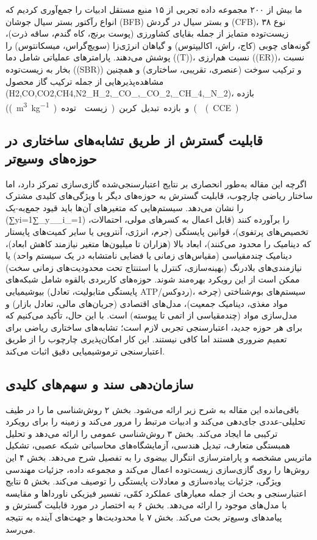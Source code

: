 \documentclass[12pt, a4paper]{article}
\begin{document}
ما بیش از ۲۰۰ مجموعه داده تجربی از ۱۵ منبع مستقل ادبیات را جمع‌آوری کردیم که انواع رآکتور بستر سیال جوشان (BFB) و بستر سیال در گردش (CFB)، ۳۸ نوع زیست‌توده متمایز از جمله بقایای کشاورزی (پوست برنج، کاه گندم، ساقه ذرت)، گونه‌های چوبی (کاج، راش، اکالیپتوس) و گیاهان انرژی‌زا (سویچ‌گراس، ميسکانتوس) را پوشش می‌دهند. پارامترهای عملیاتی شامل دما (\en(T))، نسبت هم‌ارزی (\en(ER))، نسبت بخار به زیست‌توده (\en(SBR)) و ترکیب سوخت (عنصری، تقریبی، ساختاری) و همچنین مشاهده‌پذیرهایی از جمله ترکیب گاز محصول (H2,CO,CO2,CH4,N2\_H\_2,\_CO\_,\_CO\_2,\_CH\_4,\_N\_2)، بازده (\si(\cubic\metre\per\kilogram) زیست‌توده) و بازده تبدیل کربن (\en(CCE)\\%

\subsection{قابلیت گسترش از طریق تشابه‌های ساختاری در حوزه‌های وسیع‌تر}

اگرچه این مقاله به‌طور انحصاری بر نتایج اعتبارسنجی‌شده گازی‌سازی تمرکز دارد، اما ساختار ریاضی چارچوب، قابلیت گسترش به حوزه‌های دیگر با ویژگی‌های کلیدی مشترک را نشان می‌دهد. سیستم‌هایی که متغیرهای آن‌ها باید قیود جمع‌به-یک (∑yi=1∑\_y\_\_i\_=1) را برآورده کنند (قابل اعمال به کسرهای مولی، احتمالات، تخصیص‌های پرتفوی)، قوانین پایستگی (جرم، انرژی، آنتروپی یا سایر کمیت‌های پایستار که دینامیک را محدود می‌کنند)، ابعاد بالا (هزاران تا میلیون‌ها متغیر نیازمند کاهش ابعاد)، دینامیک چندمقیاسی (مقیاس‌های زمانی یا فضایی نامتشابه در یک سیستم واحد) یا نیازمندی‌های بلادرنگ (بهینه‌سازی، کنترل یا استنتاج تحت محدودیت‌های زمانی سخت) ممکن است از این رویکرد بهره‌مند شوند. حوزه‌های کاربردی بالقوه شامل شبکه‌های بیوشیمیایی (پایستگی متابولیت، تعادل ATP/ردوکس)، سیستم‌های بوم‌شناختی (چرخه مواد مغذی، دینامیک جمعیت)، مدل‌های اقتصادی (جریان‌های مالی، تعادل بازار) و مدل‌سازی مواد (چندمقیاسی از اتمی تا پیوسته) است. با این حال، تأکید می‌کنیم که برای هر حوزه جدید، اعتبارسنجی تجربی لازم است؛ تشابه‌های ساختاری ریاضی برای تعمیم ضروری هستند اما کافی نیستند. این کار امکان‌پذیری چارچوب را از طریق اعتبارسنجی ترموشیمیایی دقیق اثبات می‌کند.

\subsection{سازمان‌دهی سند و سهم‌های کلیدی}

باقی‌مانده این مقاله به شرح زیر ارائه می‌شود. بخش ۲ روش‌شناسی ما را در طیف تحلیلی-عددی جای‌دهی می‌کند و ادبیات مرتبط را مرور می‌کند و زمینه را برای رویکرد ترکیبی ما ایجاد می‌کند. بخش ۳ روش‌شناسی عمومی را ارائه می‌دهد و تحلیل همبستگی متعارف، تبدیل هندسی، آزمایشگاه‌های محاسباتی شبکه عصبی، تشکیل ماتریس مشخصه و پارامترسازی انتگرال بیضوی را به تفصیل شرح می‌دهد. بخش ۴ این روش‌ها را روی گازی‌سازی زیست‌توده اعمال می‌کند و مجموعه داده، جزئیات مهندسی ویژگی، جزئیات پیاده‌سازی و معادلات پایستگی را توصیف می‌کند. بخش ۵ نتایج اعتبارسنجی و بحث از جمله معیارهای عملکرد کمّی، تفسیر فیزیکی ناورداها و مقایسه با مدل‌های موجود را ارائه می‌دهد. بخش ۶ به اختصار در مورد قابلیت گسترش و پیامدهای وسیع‌تر بحث می‌کند. بخش ۷ با محدودیت‌ها و جهت‌های آینده به نتیجه می‌رسد.
\end{document}
